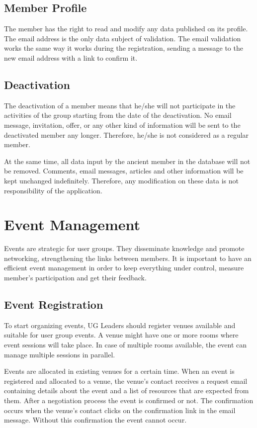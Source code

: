 \documentclass[envcountsame,envcountchap]{svmono}
\begin{document}
\section{Member Profile}

The member has the right to read and modify any data published on its profile. The email address is the only data subject of validation. The email validation works the same way it works during the registration, sending a message to the new email address with a link to confirm it.

\section{Deactivation}

The deactivation of a member means that he/she will not participate in the activities of the group  starting from the date of the deactivation. No email message, invitation, offer, or any other kind of information will be sent to the deactivated member any longer. Therefore, he/she is not considered as a regular member.

At the same time, all data input by the ancient member in the database will not be removed. Comments, email messages, articles and other information will be kept unchanged indefinitely. Therefore, any modification on these data is not responsibility of the application.

\chapter{Event Management}
\label{chp:event-management}

Events are strategic for user groups. They disseminate knowledge and promote networking, strengthening the links between members. It is important to have an efficient event management in order to keep everything under control, measure member's participation and get their feedback.

\section{Event Registration}

To start organizing events, UG Leaders should register venues available and suitable for user group events. A venue might have one or more rooms where event sessions will take place. In case of multiple rooms available, the event can manage multiple sessions in parallel.

Events are allocated in existing venues for a certain time. When an event is registered and allocated to a venue, the venue's contact receives a request email containing details about the event and a list of resources that are expected from them. After a negotiation process the event is confirmed or not. The confirmation occurs when the venue's contact clicks on the confirmation link in the email message. Without this confirmation the event cannot occur.
\end{document}
